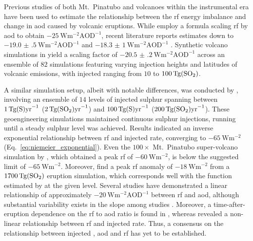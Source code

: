 \documentclass{ametsocV6.1}
\newcommand{\iso}[1][i]{{#1}njected \ce{SO2}}
\begin{document}
Previous studies of both Mt.\ Pinatubo \citep{mills2017,hansen2005} and volcanoes within
the instrumental era \citep{gregory2016} have been used to estimate the relationship
between the \gls{rf} energy imbalance and change in \gls{aod} caused by volcanic
eruptions. While \citet{myhre2013} employ a formula scaling \gls{rf} by \gls{aod} to
obtain \(\SI{-25}{\watt\metre^{-2}\mathrm{AOD}^{-1}}\), recent literature reports
estimates down to \(\SI{-19.0(5)}{\watt\metre^{-2}\mathrm{AOD}^{-1}}\)
\citep{gregory2016} and \(\SI{-18.3(10)}{\watt\metre^{-2}\mathrm{AOD}^{-1}}\)
\citep{mills2017}. Synthetic volcano simulations in \citet{marshall2020} yield a scaling
factor of \(\SI{-20.5(2)}{\watt\metre^{-2}\mathrm{AOD}^{-1}}\) across an ensemble of
\(82\) simulations featuring varying injection heights and latitudes of volcanic
emissions, with \iso{} ranging from \(10\) to \(\SI{100}{\tera\gram(\ce{SO2})}\).

A similar simulation setup, albeit with notable differences, was conducted
by \citet{niemeier2015}, involving an ensemble of \(14\) levels of injected sulphur
spanning between \(\SI{1}{\tera\gram(\ce{S})\mathrm{yr}^{-1}}\)
(\(\SI{2}{\tera\gram(\ce{SO2})\mathrm{yr}^{-1}}\)) and
\(\SI{100}{\tera\gram(\ce{S})\mathrm{yr}^{-1}}\)
(\(\SI{200}{\tera\gram(\ce{SO2})\mathrm{yr}^{-1}}\)). These geoengineering simulations
maintained continuous sulphur injections, running until a steady sulphur level was
achieved. Results indicated an inverse exponential relationship between \gls{rf} and
\iso{} rate, converging to \(\SI{-65}{\watt\metre^{-2}}\)
(Eq.~\ref{eq:niemeier_exponential}). Even the \(100\times\) Mt.\ Pinatubo
super-volcano simulation by \citet{jones2005}, which obtained a peak \gls{rf} of
\(\SI{-60}{\watt\metre^{-2}}\), is below the suggested limit of
\(\SI{-65}{\watt\metre^{-2}}\). Moreover, \citet{timmreck2010} find a peak \gls{rf}
anomaly of \(\SI{-18}{\watt\metre^{-2}}\) from a \(\SI{1700}{\tera\gram(\ce{SO2})}\)
eruption simulation, which corresponds well with the function estimated by
\citet{niemeier2015} at the given  level.
Several studies have demonstrated a linear relationship of approximately
\(-\SI{20}{\watt\metre^{-2}\mathrm{AOD}^{-1}}\) between \gls{rf} and \gls{aod}, although
substantial variability exists in the slope among studies
\citep{mills2017,hansen2005,gregory2016,marshall2020,pitari2016b}. Moreover, a
time-after-eruption dependence on the \gls{rf} to \gls{aod} ratio is found in
\citet{marshall2020}, whereas \citet{niemeier2015} revealed a non-linear relationship
between \gls{rf} and \iso{} rate. Thus, a consensus on the relationship between \iso{},
\gls{aod} and \gls{rf} has yet to be established.
\end{document}
